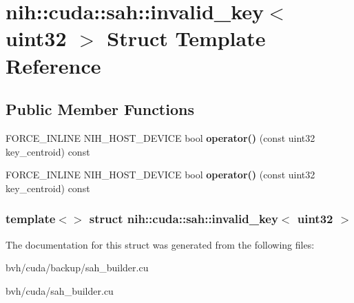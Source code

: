 \hypertarget{structnih_1_1cuda_1_1sah_1_1invalid__key_3_01uint32_01_4}{
\section{nih\-:\-:cuda\-:\-:sah\-:\-:invalid\-\_\-key$<$ uint32 $>$ \-Struct \-Template \-Reference}
\label{structnih_1_1cuda_1_1sah_1_1invalid__key_3_01uint32_01_4}
}
\subsection*{\-Public \-Member \-Functions}
\begin{DoxyCompactItemize}
\item 
\hypertarget{structnih_1_1cuda_1_1sah_1_1invalid__key_3_01uint32_01_4_a5bf5968077ea41fc5395917f174aa61c}{
\-F\-O\-R\-C\-E\-\_\-\-I\-N\-L\-I\-N\-E \-N\-I\-H\-\_\-\-H\-O\-S\-T\-\_\-\-D\-E\-V\-I\-C\-E bool {\bfseries operator()} (const uint32 key\-\_\-centroid) const }
\label{structnih_1_1cuda_1_1sah_1_1invalid__key_3_01uint32_01_4_a5bf5968077ea41fc5395917f174aa61c}

\item 
\hypertarget{structnih_1_1cuda_1_1sah_1_1invalid__key_3_01uint32_01_4_a5bf5968077ea41fc5395917f174aa61c}{
\-F\-O\-R\-C\-E\-\_\-\-I\-N\-L\-I\-N\-E \-N\-I\-H\-\_\-\-H\-O\-S\-T\-\_\-\-D\-E\-V\-I\-C\-E bool {\bfseries operator()} (const uint32 key\-\_\-centroid) const }
\label{structnih_1_1cuda_1_1sah_1_1invalid__key_3_01uint32_01_4_a5bf5968077ea41fc5395917f174aa61c}

\end{DoxyCompactItemize}
\subsubsection*{template$<$$>$ struct nih\-::cuda\-::sah\-::invalid\-\_\-key$<$ uint32 $>$}



\-The documentation for this struct was generated from the following files\-:\begin{DoxyCompactItemize}
\item 
bvh/cuda/backup/sah\-\_\-builder.\-cu\item 
bvh/cuda/sah\-\_\-builder.\-cu\end{DoxyCompactItemize}
